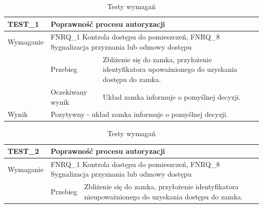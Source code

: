         \begin{table}[h!]
            \caption{Testy wymagań}
            \centering
            \begin{subtable}[c]{\textwidth}
                \centering
                    \begin{tabular}{|p{2cm}|p{}|p{}|}
                    \hline
                    TEST\_1               & \multicolumn{2}{l|}{\textbf{Poprawność procesu autoryzacji}} \\ \hline
                    \cellcolor[gray]{0.8} Wymaganie             & \multicolumn{2}{p{12cm}|}{FNRQ\_1 Kontrola dostępu do pomieszczeń, FNRQ\_8 Sygnalizacja przyznania lub odmowy dostępu} \\ \hline
                    \cellcolor[gray]{0.8} \multirow{2}{*}{Opis} & Przebieg           & Zbliżenie się do zamka, przyłożenie identyfikatora upoważnionego do uzyskania dostępu do zamka. \\ \cline{2-3} 
                    \cellcolor[gray]{0.8}                      & Oczekiwany wynik   & Układ zamka informuje o pomyślnej decyzji.                                                 \\ \hline
                    \cellcolor[gray]{0.8} Wynik                 & \multicolumn{2}{p{12cm}|}{Pozytywny - układ zamka informuje o pomyślnej decyzji.}                                                                                  \\ \hline
                    \end{tabular}%
                \label{tbl:test1}
                \vspace{10mm}
            \end{subtable}
        \quad%
            \begin{subtable}[c]{\textwidth}
                \centering
                    \begin{tabular}{|p{2cm}|p{}|p{}|}
                    \hline
                    TEST\_2               & \multicolumn{2}{l|}{\textbf{Poprawność procesu autoryzacji}}                                                            \\ \hline
                    \cellcolor[gray]{0.8} Wymaganie             & \multicolumn{2}{p{12cm}|}{FNRQ\_1 Kontrola dostępu do pomieszczeń, FNRQ\_8 Sygnalizacja przyznania lub odmowy dostępu}                                                                                    \\ \hline
                    \cellcolor[gray]{0.8} \multirow{2}{*}{Opis} & Przebieg           & Zbliżenie się do zamka, przyłożenie identyfikatora nieupoważnionego do uzyskania dostępu do zamka. \\ \cline{2-3} 

\end{tabular}
\end{subtable}
\end{table}
